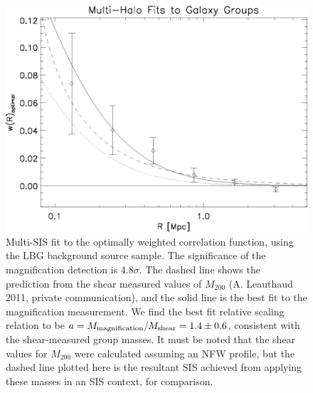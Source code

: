 \begin{figure}
\begin{center}
\includegraphics[scale=1.0]{plots_ch2/wopt_nfw_sis_44x_LFam1_aveErr07magcut.eps}
\caption[Optimally-Weighted Cross-Correlation]{Multi-\ac{SIS} fit to the optimally weighted correlation function, using the \ac{LBG} background source sample. The significance of the magnification detection is $4.8 \sigma$.  The dashed line shows the prediction from the shear measured values of $M_{200}$ (A. Leauthaud 2011, private communication), and the solid line is the best fit to the magnification measurement.  We find the best fit relative scaling relation to be $a= M_{\rm magnification}/M_{\rm shear}=1.4 \pm 0.6$, consistent with the shear-measured group masses.  It must be noted that the shear values for $M_{200}$ were calculated assuming an \ac{NFW} profile, but the dashed line plotted here is the resultant \ac{SIS} achieved from applying these masses in an \ac{SIS} context, for comparison.}
\label{plot:multisis2}
\end{center}
\end{figure}


